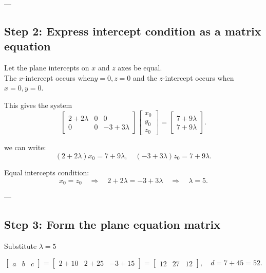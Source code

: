 \documentclass[journal]{IEEEtran}
\begin{document}
---

\subsection*{Step 2: Express intercept condition as a matrix equation}

Let the plane intercepts on $x$ and $z$ axes be equal. \\ 

The $x$-intercept occurs when$y=0, z=0$ and the $z$-intercept occurs when $x=0, y=0$.  

This gives the system
\begin{equation}
\begin{bmatrix}
2 + 2\lambda & 0 & 0 \\
0 & 0 & -3 + 3\lambda
\end{bmatrix}
\begin{bmatrix} x_0 \\ y_0 \\ z_0 \end{bmatrix} =
\begin{bmatrix} 7 + 9\lambda \\ 7 + 9\lambda \end{bmatrix}. \label{eq:intercept_matrix}
\end{equation}

 we can write:
\begin{equation}
(2 + 2\lambda)x_0 = 7 + 9\lambda, \quad (-3 + 3\lambda) z_0 = 7 + 9\lambda. 
\end{equation}

Equal intercepts condition:
\begin{equation}
x_0 = z_0 \quad \Rightarrow \quad 2 + 2\lambda = -3 + 3\lambda \quad \Rightarrow \quad \lambda = 5. 
\end{equation}

---

\subsection*{Step 3: Form the plane equation matrix}

Substitute \(\lambda = 5\)

\[
\begin{bmatrix} a & b & c \end{bmatrix} = \begin{bmatrix} 2 + 10 & 2 + 25 & -3 + 15 \end{bmatrix} = \begin{bmatrix} 12 & 27 & 12 \end{bmatrix}, \quad d = 7 + 45 = 52.
\]
\end{document}
